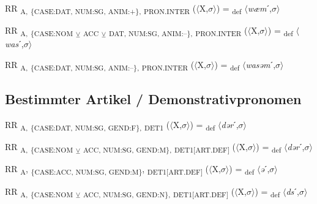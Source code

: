 {\begin{exe}
 RR \textsubscript{A,} \textsubscript{\{CASE:DAT, NUM:SG, ANIM:+\},} \textsubscript{PRON.INTER} ($\langle$X,$\sigma $$\rangle$) = \textsubscript{def} $\langle$\textit{wæm}ˊ,$\sigma $$\rangle$
\end{exe}

\begin{exe}
 RR \textsubscript{A,} \textsubscript{\{CASE:NOM} \textsubscript{${\veebar}$}\textsubscript{ ACC} \textsubscript{${\veebar}$}\textsubscript{ DAT, NUM:SG, ANIM:–\},} \textsubscript{PRON.INTER} ($\langle$X,$\sigma $$\rangle$) = \textsubscript{def} $\langle$\textit{was}ˊ,$\sigma $$\rangle$
\end{exe}

\begin{exe}
 RR \textsubscript{A,} \textsubscript{\{CASE:DAT, NUM:SG, ANIM:–\},} \textsubscript{PRON.INTER} ($\langle$X,$\sigma $$\rangle$) = \textsubscript{def} $\langle$\textit{wasəm}ˊ,$\sigma $$\rangle$
\end{exe}

\subsection{Bestimmter Artikel / Demonstrativpronomen}


\begin{exe}
 RR \textsubscript{A,} \textsubscript{\{CASE:DAT, NUM:SG, GEND:F\},} \textsubscript{DET1} ($\langle$X,$\sigma $$\rangle$) = \textsubscript{def} $\langle$\textit{dər}ˊ,$\sigma $$\rangle$
\end{exe}

\begin{exe}
 RR \textsubscript{A,} \textsubscript{\{CASE:NOM} \textsubscript{${\veebar}$}\textsubscript{ ACC, NUM:SG, GEND:M\},} \textsubscript{DET1[ART.DEF]} ($\langle$X,$\sigma $$\rangle$) = \textsubscript{def} $\langle$\textit{dər}ˊ,$\sigma $$\rangle$
\end{exe}

\begin{exe}
 RR \textsubscript{A}, \textsubscript{\{CASE:ACC, NUM:SG, GEND:M\}}, \textsubscript{DET1[ART.DEF]} ($\langle$X,$\sigma $$\rangle$) = \textsubscript{def} $\langle$\textit{ə}ˊ,$\sigma $$\rangle$
\end{exe}

\begin{exe}
 RR \textsubscript{A,} \textsubscript{\{CASE:NOM} \textsubscript{${\veebar}$}\textsubscript{ ACC, NUM:SG, GEND:N\},} \textsubscript{DET1[ART.DEF]} ($\langle$X,$\sigma $$\rangle$) = \textsubscript{def} $\langle$\textit{ds}ˊ,$\sigma $$\rangle$
\end{exe}

}
